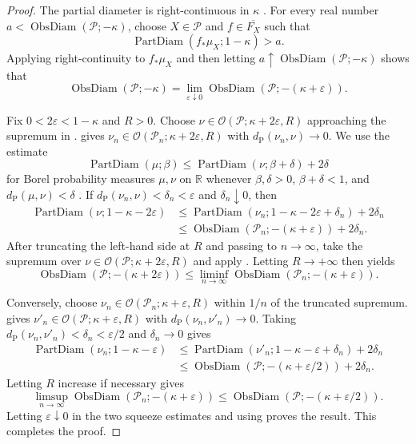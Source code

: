 \documentclass{amsart}
\theoremstyle{plain}
\theoremstyle{definition}
\theoremstyle{remark}
\newcommand{\R}{\mathbb{R}}
\DeclareMathOperator{\pd}{PartDiam}
\DeclareMathOperator{\od}{ObsDiam}
\newcommand{\dpr}{d_{\operatorname{P}}}
\begin{document}
\begin{proof}
The partial diameter is right-continuous in $\kappa$
\cite[Lemma~4.13]{gds1}.  For every real number
$a<\od(\mathcal P;-\kappa)$, choose
$X\in\mathcal P$ and $f\in\overline{F_X}$ such that
\[
\pd(f_*\mu_X;1-\kappa)>a.
\]
Applying right-continuity to $f_*\mu_X$ and then letting
$a\uparrow\od(\mathcal P;-\kappa)$ shows that
\begin{equation}
\label{eq:pyramid-obsdiam-right-continuity}
\od(\mathcal P;-\kappa)=
\lim_{\varepsilon\downarrow0}\od(\mathcal P;-(\kappa+\varepsilon)).
\end{equation}

Fix $0<2\varepsilon<1-\kappa$ and $R>0$.  Choose
$\nu\in\mathcal O(\mathcal P;\kappa+2\varepsilon,R)$ approaching the
supremum in .
 gives
$\nu_n\in\mathcal O(\mathcal P_n;\kappa+2\varepsilon,R)$ with
$\dpr(\nu_n,\nu)\to0$.  We use the estimate
\[
\pd(\mu;\beta)\leq\pd(\nu;\beta+\delta)+2\delta
\]
for Borel probability measures $\mu,\nu$ on $\R$ whenever
$\beta,\delta>0$, $\beta+\delta<1$, and $\dpr(\mu,\nu)<\delta$
\cite[Lemma~4.11]{gds1}.  If
$\dpr(\nu_n,\nu)<\delta_n<\varepsilon$ and $\delta_n\downarrow0$, then
\begin{align*}
\pd(\nu;1-\kappa-2\varepsilon) &\leq\pd(\nu_n;1-\kappa-2\varepsilon+\delta_n)+2\delta_n\\
&\leq\od(\mathcal P_n;-(\kappa+\varepsilon))+2\delta_n.
\end{align*}
After truncating the left-hand side at $R$ and passing to $n\to\infty$,
take the supremum over
$\nu\in\mathcal O(\mathcal P;\kappa+2\varepsilon,R)$ and apply
.  Letting
$R\to+\infty$ then yields
\begin{equation}
\label{eq:obsdiam-limit-lower-squeeze}
\od(\mathcal P;-(\kappa+2\varepsilon))
\leq\liminf_{n\to\infty}\od(\mathcal P_n;-(\kappa+\varepsilon)).
\end{equation}

Conversely, choose
$\nu_n\in\mathcal O(\mathcal P_n;\kappa+\varepsilon,R)$ within $1/n$ of the
truncated supremum.   gives
$\nu'_n\in\mathcal O(\mathcal P;\kappa+\varepsilon,R)$ with
$\dpr(\nu_n,\nu'_n)\to0$.  Taking
$\dpr(\nu_n,\nu'_n)<\delta_n<\varepsilon/2$ and $\delta_n\to0$ gives
\begin{align*}
\pd(\nu_n;1-\kappa-\varepsilon) &\leq\pd(\nu'_n;1-\kappa-\varepsilon+\delta_n)+2\delta_n\\
&\leq\od(\mathcal P;-(\kappa+\varepsilon/2))+2\delta_n.
\end{align*}
Letting $R$ increase if necessary gives
\begin{equation}
\label{eq:obsdiam-limit-upper-squeeze}
\limsup_{n\to\infty}\od(\mathcal P_n;-(\kappa+\varepsilon))
\leq\od(\mathcal P;-(\kappa+\varepsilon/2)).
\end{equation}
Letting $\varepsilon\downarrow0$ in the two squeeze estimates and using
 proves the result.  This
completes the proof.
\end{proof}
\end{document}
